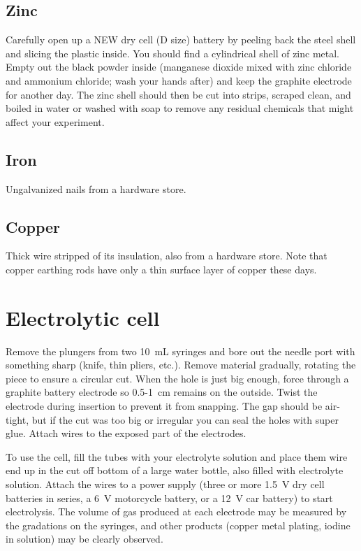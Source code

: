 \subsection{Zinc}
Carefully open up a NEW dry cell (D size) battery by peeling back the steel shell and slicing the plastic inside. You should find a cylindrical shell of zinc metal. Empty out the black powder inside (manganese dioxide mixed with zinc chloride and ammonium chloride; wash your hands after) and keep the graphite electrode for another day. The zinc shell should then be cut into strips, scraped clean, and boiled in water or washed with soap to remove any residual chemicals that might affect your experiment.
\subsection{Iron}
Ungalvanized nails from a hardware store.
\subsection{Copper}
Thick wire stripped of its insulation, also from a hardware store. Note that copper earthing rods have only a thin surface layer of copper these days.

\section{Electrolytic cell}
\label{sec:electrolytic-cell}
Remove the plungers from two 10~mL syringes 
and bore out the needle port with something sharp (knife, 
thin pliers, 
etc.). 
Remove material gradually, 
rotating the piece to ensure a circular cut. 
When the hole is just big enough, 
force through a graphite battery electrode 
so 0.5-1~cm remains on the outside. 
Twist the electrode during insertion to prevent it from snapping. 
The gap should be air-tight, 
but if the cut was too big or irregular 
you can seal the holes with super glue. 
Attach wires to the exposed part of the electrodes.

To use the cell, 
fill the tubes with your electrolyte solution 
and place them wire end up in the cut off bottom of a large water bottle, 
also filled with electrolyte solution. 
Attach the wires to a power supply 
(three or more 1.5~V dry cell batteries in series, 
a 6~V motorcycle battery, 
or a 12~V car battery) to start electrolysis. 
The volume of gas produced at each electrode 
may be measured by the gradations on the syringes, 
and other products (copper metal plating, 
iodine in solution) may be clearly observed.

